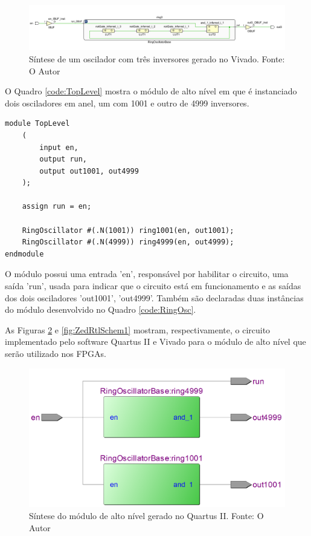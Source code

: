 \begin{figure}[H]
    \centering
    \includegraphics[width=\linewidth]{figures/Metodologia/ZedBoard_Implementation_3Inverter.png}
    \caption{Síntese de um oscilador com três inversores gerado no Vivado. Fonte: O Autor}
    \label{fig:ZedImp3Osc}
\end{figure}

O Quadro \ref{code:TopLevel} mostra o módulo de alto nível em que é instanciado dois osciladores em anel, um com 1001 e outro de 4999 inversores. 

\begin{lstlisting}[label={code:TopLevel}, style=VerilogStyle, caption={Instanciação dos Módulos. Fonte: O Autor}]
module TopLevel
	(
		input en,
		output run,
		output out1001, out4999
	);
	
	assign run = en;

	RingOscillator #(.N(1001)) ring1001(en, out1001);
	RingOscillator #(.N(4999)) ring4999(en, out4999);
endmodule
\end{lstlisting}

O módulo possui uma entrada 'en', responsável por habilitar o circuito, uma saída 'run', usada para indicar que o circuito está em funcionamento e as saídas dos dois osciladores 'out1001', 'out4999'. Também são declaradas duas instâncias do módulo desenvolvido no Quadro \ref{code:RingOsc}.

As Figuras \ref{fig:DE2RtlSchem} e \ref{fig:ZedRtlSchem1} mostram, respectivamente, o circuito implementado pelo software Quartus II e Vivado para o módulo de alto nível que serão utilizado nos FPGAs.

\begin{figure}[H]
    \centering
    \includegraphics[scale=0.25]{figures/Metodologia/DE2_RTL_Schematic.png}
    \caption{Síntese do módulo de alto nível gerado no Quartus II. Fonte: O Autor}
    \label{fig:DE2RtlSchem}
\end{figure}

